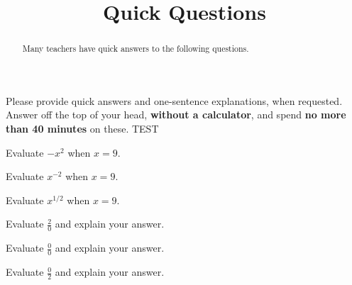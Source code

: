 \documentclass{ximera}
\title{Quick Questions}
\begin{document}
\begin{abstract}
Many teachers have quick answers to the following questions.  
\end{abstract}
\maketitle

Please provide quick answers and one-sentence explanations, when requested.  Answer off the top of your head, \textbf{without a calculator}, and spend \textbf{no more than 40 minutes} on these.  TEST

%
%

\begin{question}
Evaluate $-x^2$ when $x=9$.
\begin{freeResponse}
\end{freeResponse}
\end{question}

\begin{question}
Evaluate $x^{-2}$ when $x=9$.
\begin{freeResponse}
\end{freeResponse}
\end{question}

\begin{question}
Evaluate $x^{1/2}$ when $x=9$.
\begin{freeResponse}
\end{freeResponse}
\end{question}

\begin{question}
Evaluate $\frac{2}{0}$ and explain your answer. 
\begin{freeResponse}
\end{freeResponse}
\end{question}

\begin{question}
Evaluate $\frac{0}{0}$ and explain your answer. 
\begin{freeResponse}
\end{freeResponse}
\end{question}

\begin{question}
Evaluate $\frac{0}{2}$ and explain your answer. 
\begin{freeResponse}
\end{freeResponse}
\end{question}
\end{document}
